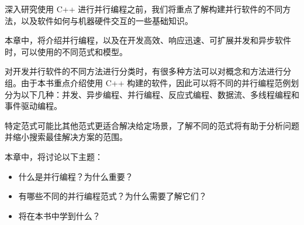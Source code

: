 深入研究使用 C++ 进行并行编程之前，我们将重点了解构建并行软件的不同方法，以及软件如何与机器硬件交互的一些基础知识。

本章中，将介绍并行编程，以及在开发高效、响应迅速、可扩展并发和异步软件时，可以使用的不同范式和模型。

对开发并行软件的不同方法进行分类时，有很多种方法可以对概念和方法进行分组。由于本书重点介绍使用 C++ 构建的软件，因此可以将不同的并行编程范例划分为以下几种：并发、异步编程、并行编程、反应式编程、数据流、多线程编程和事件驱动编程。

特定范式可能比其他范式更适合解决给定场景，了解不同的范式将有助于分析问题并缩小搜索最佳解决方案的范围。

本章中，将讨论以下主题：

\begin{itemize}
\item
什么是并行编程？为什么重要？

\item
有哪些不同的并行编程范式？为什么需要了解它们？

\item
将在本书中学到什么？
\end{itemize}